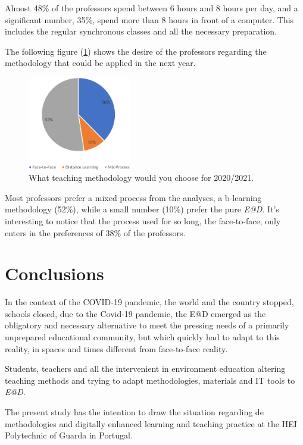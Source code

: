 \documentclass{textolivre}
\begin{document}
Almost 48\% of the professors spend between 6 hours and 8 hours per day, and a significant number, 35\%, spend more than 8 hours in front of a computer. This includes the regular synchronous classes and all the necessary preparation.

The following figure (\ref{fig7}) shows the desire of the professors regarding the methodology that could be applied in the next year. 

\begin{figure}[htbp]
 \centering
 \includegraphics[width=0.4\textwidth]{Fig_007.pdf}
 \caption{What teaching methodology would you choose for 2020/2021.}
 \label{fig7}
\end{figure}

Most professors prefer a mixed process from the analyses, a b-learning methodology (52\%), while a small number (10\%) prefer the pure \emph{E@D}. It's interesting to notice that the process used for so long, the face-to-face, only enters in the preferences of 38\% of the professors.

\section{Conclusions}
In the context of the COVID-19 pandemic, the world and the country stopped, schools closed, due to the Covid-19 pandemic, the E@D emerged as the obligatory and necessary alternative to meet the pressing needs of a primarily unprepared educational community, but which quickly had to adapt to this reality, in spaces and times different from face-to-face reality. 

Students, teachers and all the intervenient in environment education altering teaching methods and trying to adapt methodologies, materials and IT tools to \emph{E@D}. 

The present study has the intention to draw the situation regarding de methodologies and digitally enhanced learning and teaching practice at the HEI Polytechnic of Guarda in Portugal.
\end{document}
